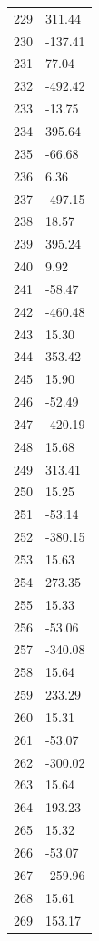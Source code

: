 \documentclass[a4paper,11pt]{article}
\begin{document}
\begin{center}
\begin{longtable}{|R{1.5cm}|R{2.5cm}|}
  229 &       311.44 \\
  230 &      -137.41 \\
  231 &        77.04 \\
  232 &      -492.42 \\
  233 &       -13.75 \\
  234 &       395.64 \\
  235 &       -66.68 \\
  236 &         6.36 \\
  237 &      -497.15 \\
  238 &        18.57 \\
  239 &       395.24 \\
  240 &         9.92 \\
  241 &       -58.47 \\
  242 &      -460.48 \\
  243 &        15.30 \\
  244 &       353.42 \\
  245 &        15.90 \\
  246 &       -52.49 \\
  247 &      -420.19 \\
  248 &        15.68 \\
  249 &       313.41 \\
  250 &        15.25 \\
  251 &       -53.14 \\
  252 &      -380.15 \\
  253 &        15.63 \\
  254 &       273.35 \\
  255 &        15.33 \\
  256 &       -53.06 \\
  257 &      -340.08 \\
  258 &        15.64 \\
  259 &       233.29 \\
  260 &        15.31 \\
  261 &       -53.07 \\
  262 &      -300.02 \\
  263 &        15.64 \\
  264 &       193.23 \\
  265 &        15.32 \\
  266 &       -53.07 \\
  267 &      -259.96 \\
  268 &        15.61 \\
  269 &       153.17 \\

\end{longtable}
\end{center}
\end{document}

